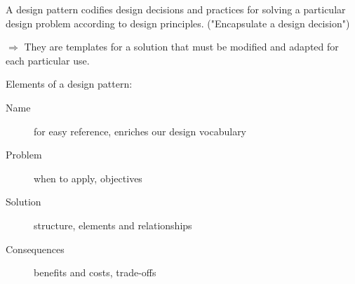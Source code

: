 A design pattern codifies design decisions and practices for solving a
particular design problem according to design principles. ("Encapsulate
a design decision")

$\Rightarrow$  They are templates for a solution that must be modified and adapted for
each particular use. 
\newline

Elements of a design pattern:

\begin{description}
    \item[Name] for easy reference, enriches our design vocabulary
    \item[Problem] when to apply, objectives
    \item[Solution] structure, elements and relationships
    \item[Consequences] benefits and costs, trade-offs
\end{description}


